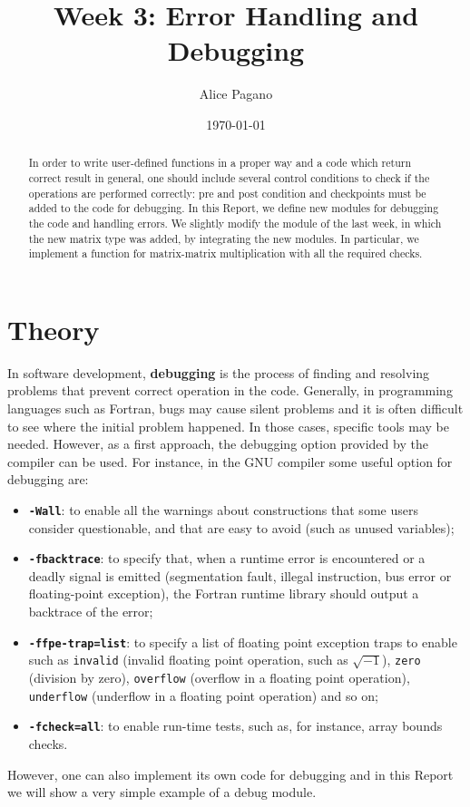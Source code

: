\documentclass[rmp,10pt,onecolumn,fleqn,notitlepage]{revtex4-1}
\begin{document}
\title{Week 3: Error Handling and Debugging}
\author{Alice Pagano}
\date{\today}

\begin{abstract}
In order to write user-defined functions in a proper way and a code which return correct result in general, one should include several control conditions to check if the operations are performed correctly: pre and post condition and checkpoints must be added to the code for debugging.
In this Report, we define new modules for debugging the code and handling errors. We slightly modify the module of the last week, in which the new matrix type was added, by integrating the new modules.
In particular, we implement a function for matrix-matrix multiplication with all the required checks.
\end{abstract}

\maketitle


\section{Theory}
In software development, \textbf{debugging} is the process of finding and resolving problems that prevent correct operation in the code.
Generally, in programming languages such as Fortran, bugs may cause silent problems and it is often difficult to see where the initial problem happened. In those cases, specific tools may be needed. However, as a first approach, the debugging option provided by the compiler can be used.
For instance, in the GNU compiler some useful option for debugging are:
\begin{itemize}
\item {\bfseries\texttt{-Wall}}: to enable all the warnings about constructions that some users consider questionable, and that are easy to avoid (such as unused variables);
\item {\bfseries\texttt{-fbacktrace}}: to specify that, when a runtime error is encountered or a deadly signal is emitted (segmentation fault, illegal instruction, bus error or floating-point exception), the Fortran runtime library should output a backtrace of the error;
\item {\bfseries\texttt{-ffpe-trap=list}}: to specify a list of floating point exception traps to enable such as {\texttt{invalid}} (invalid floating point operation, such as \( \sqrt{-1}  \)), {\texttt{zero}} (division by zero), {\texttt{overflow}} (overflow in a floating point operation), {\texttt{underflow}} (underflow in a floating point operation) and so on;
\item {\bfseries\texttt{-fcheck=all}}: to enable run-time tests, such as, for instance, array bounds checks.
\end{itemize}
However, one can also implement its own code for debugging and in this Report we will show a very simple example of a debug module.
\end{document}

